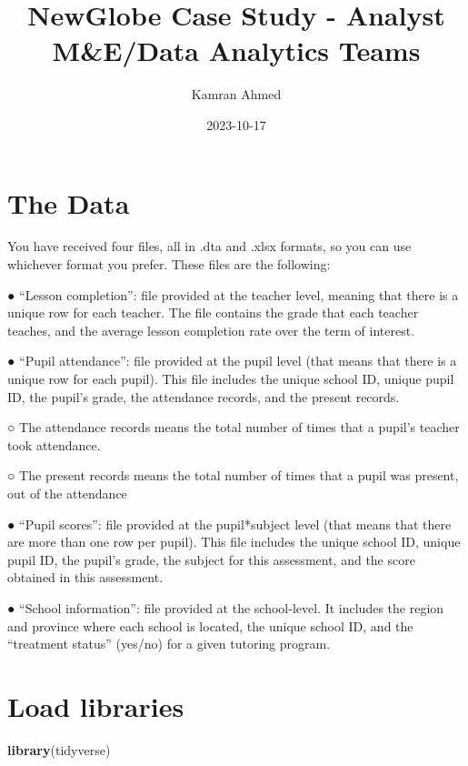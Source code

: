 \documentclass[
]{article}
\title{NewGlobe Case Study - Analyst M\&E/Data Analytics Teams}
\author{Kamran Ahmed}
\date{2023-10-17}
\newenvironment{Shaded}{\begin{snugshade}}{\end{snugshade}}
\newcommand{\FunctionTok}[1]{\textcolor[rgb]{0.13,0.29,0.53}{\textbf{#1}}}
\newcommand{\NormalTok}[1]{#1}
\begin{document}
\maketitle

\hypertarget{the-data}{%
\section{The Data}\label{the-data}}

You have received four files, all in .dta and .xlsx formats, so you can
use whichever format you prefer. These files are the following:

● ``Lesson completion'': file provided at the teacher level, meaning
that there is a unique row for each teacher. The file contains the grade
that each teacher teaches, and the average lesson completion rate over
the term of interest.

● ``Pupil attendance'': file provided at the pupil level (that means
that there is a unique row for each pupil). This file includes the
unique school ID, unique pupil ID, the pupil's grade, the attendance
records, and the present records.

○ The attendance records means the total number of times that a pupil's
teacher took attendance.

○ The present records means the total number of times that a pupil was
present, out of the attendance

● ``Pupil scores'': file provided at the pupil*subject level (that means
that there are more than one row per pupil). This file includes the
unique school ID, unique pupil ID, the pupil's grade, the subject for
this assessment, and the score obtained in this assessment.

● ``School information'': file provided at the school-level. It includes
the region and province where each school is located, the unique school
ID, and the ``treatment status'' (yes/no) for a given tutoring program.

\hypertarget{load-libraries}{%
\section{Load libraries}\label{load-libraries}}

\begin{Shaded}
\begin{Highlighting}[]
\FunctionTok{library}\NormalTok{(tidyverse)}
\end{Highlighting}
\end{Shaded}
\end{document}
